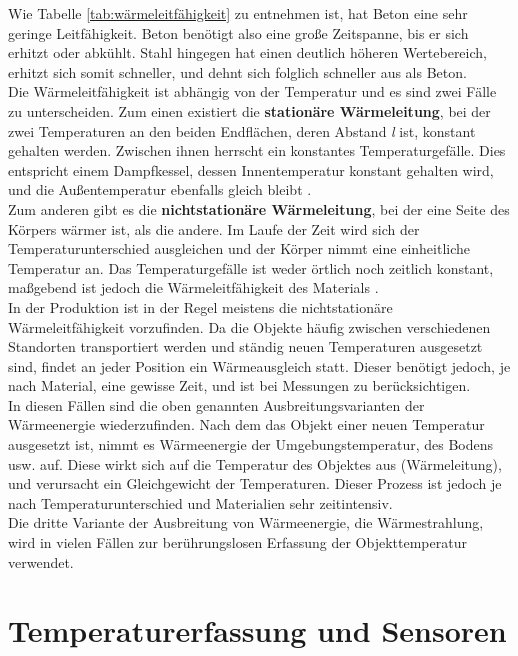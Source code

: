 Wie Tabelle \ref{tab:wärmeleitfähigkeit} zu entnehmen ist, hat Beton eine sehr geringe Leitfähigkeit. Beton benötigt also eine große Zeitspanne, bis er sich erhitzt oder abkühlt. Stahl hingegen hat einen deutlich höheren Wertebereich, erhitzt sich somit schneller, und dehnt sich folglich schneller aus als Beton.\\
Die Wärmeleitfähigkeit ist abhängig von der Temperatur und es sind zwei Fälle zu unterscheiden.
Zum einen existiert die \textbf{stationäre Wärmeleitung}, bei der zwei Temperaturen an den beiden Endflächen, deren Abstand \textit{l} ist, konstant gehalten werden. Zwischen ihnen herrscht ein konstantes Temperaturgefälle. Dies entspricht einem Dampfkessel, dessen Innentemperatur konstant gehalten wird, und die Außentemperatur ebenfalls gleich bleibt \cite{Lindner2006}.\\
Zum anderen gibt es die \textbf{nichtstationäre Wärmeleitung}, bei der eine Seite des Körpers wärmer ist, als die andere. Im Laufe der Zeit wird sich der Temperaturunterschied ausgleichen und der Körper nimmt eine einheitliche Temperatur an. Das Temperaturgefälle ist weder örtlich noch zeitlich konstant, maßgebend ist jedoch die Wärmeleitfähigkeit des Materials \cite{Lindner2006}.\\
In der Produktion ist in der Regel meistens die nichtstationäre Wärmeleitfähigkeit vorzufinden. Da die Objekte häufig zwischen verschiedenen Standorten transportiert werden und ständig neuen Temperaturen ausgesetzt sind, findet an jeder Position ein Wärmeausgleich statt. Dieser benötigt jedoch, je nach Material, eine gewisse Zeit, und ist bei Messungen zu berücksichtigen. \\
In diesen Fällen sind die oben genannten Ausbreitungsvarianten der Wärmeenergie wiederzufinden. Nach dem das Objekt einer neuen Temperatur ausgesetzt ist, nimmt es Wärmeenergie der Umgebungstemperatur, des Bodens usw. auf. Diese wirkt sich auf die Temperatur des Objektes aus (Wärmeleitung), und verursacht ein Gleichgewicht der Temperaturen. Dieser Prozess ist jedoch je nach Temperaturunterschied und Materialien sehr zeitintensiv. \\
Die dritte Variante der Ausbreitung von Wärmeenergie, die Wärmestrahlung, wird in vielen Fällen zur berührungslosen Erfassung der Objekttemperatur verwendet.

\chapter{Temperaturerfassung und Sensoren}\label{chap:Temperaturerfassung}

